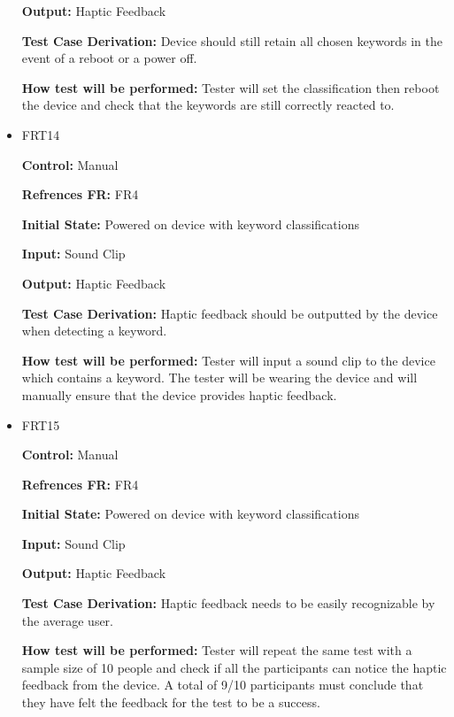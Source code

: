 \documentclass[12pt, titlepage]{article}
\begin{document}
\begin{itemize}
\textbf{Output:} Haptic Feedback

\textbf{Test Case Derivation:} Device should still retain all chosen keywords in the event of a reboot or a power off.
					
\textbf{How test will be performed:} Tester will set the classification then reboot the device and check that the keywords are still correctly reacted to. 


\item{FRT14}

\textbf{Control:} Manual

\textbf{Refrences FR:} FR4 					

\textbf{Initial State:} Powered on device with keyword classifications
					
\textbf{Input:} Sound Clip
					
\textbf{Output:} Haptic Feedback

\textbf{Test Case Derivation:} Haptic feedback should be outputted by the device when detecting a keyword.
					
\textbf{How test will be performed:} Tester will input a sound clip to the device which contains a keyword. The tester will be wearing the device and will manually ensure that the device provides haptic feedback. 


\item{FRT15}

\textbf{Control:} Manual

\textbf{Refrences FR:} FR4 					

\textbf{Initial State:} Powered on device with keyword classifications
					
\textbf{Input:} Sound Clip
					
\textbf{Output:} Haptic Feedback

\textbf{Test Case Derivation:} Haptic feedback needs to be easily recognizable by the average user.
					
\textbf{How test will be performed:} Tester will repeat the same test with a sample size of 10 people and check if all the participants can notice the haptic feedback from the device. A total of 9/10 participants must conclude that they have felt the feedback for the test to be a success.


\end{itemize}
\end{document}
